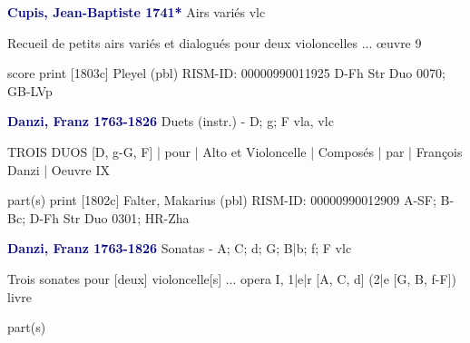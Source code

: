 \documentclass[twocolumn]{book}
\begin{document}
\newline \par \vspace{7pt} \textcolor{darkblue}{\textbf{Cupis, Jean-Baptiste  1741*}}
\newline Airs variés
 vlc
\newline \begin{itshape}Recueil de petits airs variés et dialogués pour deux violoncelles ... œuvre 9\end{itshape} 
\newline \textcolor{darkblue}{}  score
\newline print  [1803c]
\newline Pleyel  (pbl)
\newline RISM-ID: 00000990011925
\newline D-Fh  Str Duo 0070; GB-LVp
\newline \par \vspace{7pt} \textcolor{darkblue}{\textbf{Danzi, Franz  1763-1826}}
\newline Duets (instr.) - D; g; F
\newline vla, vlc
\newline \begin{itshape}TROIS DUOS [D, g-G, F] | pour | Alto et Violoncelle | Composés | par | François Danzi |  Oeuvre IX\end{itshape} 
\newline \textcolor{darkblue}{}  part(s)
\newline print  [1802c]
\newline Falter, Makarius  (pbl)
\newline RISM-ID: 00000990012909
\newline A-SF; B-Bc; D-Fh  Str Duo 0301; HR-Zha
\newline \par \vspace{7pt} \textcolor{darkblue}{\textbf{Danzi, Franz  1763-1826}}
\newline Sonatas - A; C; d; G; B|b; f; F
 vlc
\newline \begin{itshape}Trois sonates pour [deux] violoncelle[s] ... opera I, 1|e|r [A, C, d] (2|e [G, B, f-F]) livre\end{itshape} 
\newline \textcolor{darkblue}{}  part(s)
\end{document}
